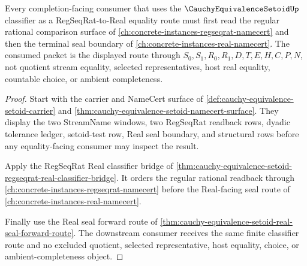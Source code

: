 \begin{theorem}
\label{thm:cauchy-equivalence-setoid-concrete-regseqrat-real-classifier-route}
Every completion-facing consumer that uses the $\CauchyEquivalenceSetoidUp$ classifier as a RegSeqRat-to-Real equality route must first read the regular rational comparison surface of \autoref{ch:concrete-instances-regseqrat-namecert} and then the terminal seal boundary of \autoref{ch:concrete-instances-real-namecert}. The consumed packet is the displayed route through $S_0,S_1,R_0,R_1,D,T,E,H,C,P,N$, not quotient stream equality, selected representatives, host real equality, countable choice, or ambient completeness.
\end{theorem}
\begin{proof}
Start with the carrier and NameCert surface of \autoref{def:cauchy-equivalence-setoid-carrier} and \autoref{thm:cauchy-equivalence-setoid-namecert-surface}. They display the two StreamName windows, two RegSeqRat readback rows, dyadic tolerance ledger, setoid-test row, Real seal boundary, and structural rows before any equality-facing consumer may inspect the result.

Apply the RegSeqRat Real classifier bridge of \autoref{thm:cauchy-equivalence-setoid-regseqrat-real-classifier-bridge}. It orders the regular rational readback through \autoref{ch:concrete-instances-regseqrat-namecert} before the Real-facing seal route of \autoref{ch:concrete-instances-real-namecert}.

Finally use the Real seal forward route of \autoref{thm:cauchy-equivalence-setoid-real-seal-forward-route}. The downstream consumer receives the same finite classifier route and no excluded quotient, selected representative, host equality, choice, or ambient-completeness object.
\end{proof}
